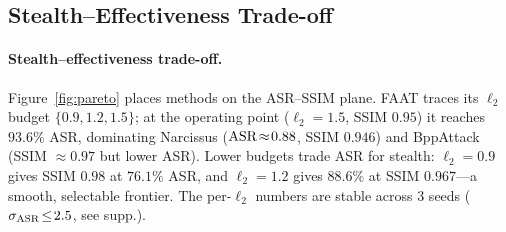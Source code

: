 \subsection{Stealth--Effectiveness Trade-off}
\label{sec:tradeoff}



\paragraph{Stealth--effectiveness trade-off.}
Figure~\ref{fig:pareto} places methods on the ASR--SSIM plane. FAAT traces its
$\ell_2$ budget $\{0.9,1.2,1.5\}$; at the operating point ($\ell_2\!=\!1.5$,
SSIM $0.95$) it reaches $93.6\%$ ASR, dominating Narcissus
($\mathrm{ASR}\!\approx\!0.88$, SSIM $0.946$) and BppAttack (SSIM $\approx\!0.97$ but
lower ASR). Lower budgets trade ASR for stealth: $\ell_2\!=\!0.9$ gives SSIM
$0.98$ at $76.1\%$ ASR, and $\ell_2\!=\!1.2$ gives $88.6\%$ at SSIM $0.967$---a
smooth, selectable frontier. The per-$\ell_2$ numbers are stable across 3 seeds
($\sigma_{\mathrm{ASR}}\!\le\!2.5$, see supp.).
